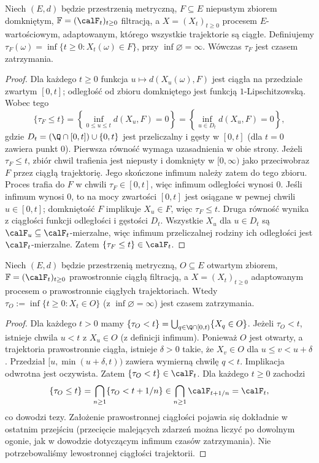 \begin{twierdzenie}
\label{thm:hitting-closed}
Niech $(E,d)$ będzie przestrzenią metryczną,
$F\subseteq E$ niepustym zbiorem domkniętym,
$\mathbb F=(\calF_t)_{t\ge0}$ filtracją, a
$X=(X_t)_{t\ge0}$ procesem $E$-wartościowym,
adaptowanym, którego wszystkie trajektorie są ciągłe.
Definiujemy $\tau_F(\omega)=\inf\{t\ge0:X_t(\omega)\in F\}$,
przy $\inf\varnothing=\infty$.
Wówczas $\tau_F$ jest czasem zatrzymania.
\end{twierdzenie}
\begin{proof}
Dla każdego $t\ge0$ funkcja
$u\mapsto d(X_u(\omega),F)$ jest ciągła na
przedziale zwartym $[0,t]$; odległość od zbioru
domkniętego jest funkcją $1$-Lipschitzowską.
Wobec tego
\[
\{\tau_F\le t\}
=\left\{\inf_{0\le u\le t}d(X_u,F)=0\right\}
=\left\{\inf_{u\in D_t}d(X_u,F)=0\right\},
\]
gdzie $D_t=(\Q\cap[0,t])\cup\{0,t\}$ jest przeliczalny
i gęsty w $[0,t]$ (dla $t=0$ zawiera punkt $0$).
Pierwsza równość wymaga uzasadnienia w obie strony.
Jeżeli $\tau_F\le t$, zbiór chwil trafienia jest
niepusty i domknięty w $[0,\infty)$ jako przeciwobraz
$F$ przez ciągłą trajektorię. Jego skończone infimum
należy zatem do tego zbioru. Proces trafia do $F$
w chwili $\tau_F\in[0,t]$, więc infimum odległości
wynosi $0$. Jeśli infimum wynosi $0$,
to na mocy zwartości $[0,t]$ jest osiągane w pewnej
chwili $u\in[0,t]$; domkniętość $F$ implikuje
$X_u\in F$, więc $\tau_F\le t$.
Druga równość wynika z ciągłości funkcji odległości
i gęstości $D_t$.
Wszystkie $X_u$ dla $u\in D_t$ są
$\calF_u\subseteq\calF_t$-mierzalne,
więc infimum przeliczalnej rodziny ich odległości
jest $\calF_t$-mierzalne. Zatem
$\{\tau_F\le t\}\in\calF_t$.
\end{proof}

\begin{twierdzenie}
Niech $(E,d)$ będzie przestrzenią metryczną,
$O\subseteq E$ otwartym zbiorem,
$\mathbb F=(\calF_t)_{t\ge0}$ prawostronnie ciągłą filtracją,
a $X=(X_t)_{t\ge0}$ adaptowanym procesem o prawostronnie
ciągłych trajektoriach. Wtedy
$\tau_O:=\inf\{t\ge0:X_t\in O\}$ (z $\inf\varnothing=\infty$)
jest czasem zatrzymania.
\end{twierdzenie}
\begin{proof}
Dla każdego $t>0$ mamy
$\{\tau_O<t\}=\bigcup_{q\in\Q\cap[0,t)}\{X_q\in O\}$.
Jeżeli $\tau_O<t$, istnieje chwila $u<t$ z $X_u\in O$
(z definicji infimum). Ponieważ $O$ jest otwarty,
a trajektoria prawostronnie ciągła, istnieje $\delta>0$
takie, że $X_v\in O$ dla $u\le v<u+\delta$.
Przedział $[u,\min(u+\delta,t))$ zawiera wymierną
chwilę $q<t$. Implikacja odwrotna
jest oczywista. Zatem $\{\tau_O<t\}\in\calF_t$.
Dla każdego $t\ge0$ zachodzi
\[
\{\tau_O\le t\}=\bigcap_{n\ge1}\{\tau_O<t+1/n\}
\in\bigcap_{n\ge1}\calF_{t+1/n}=\calF_t,
\]
co dowodzi tezy. Założenie prawostronnej ciągłości
pojawia się dokładnie w ostatnim przejściu (przecięcie
malejących zdarzeń można liczyć po dowolnym ogonie,
jak w dowodzie dotyczącym infimum czasów zatrzymania).
Nie potrzebowaliśmy lewostronnej ciągłości trajektorii.
\end{proof}

